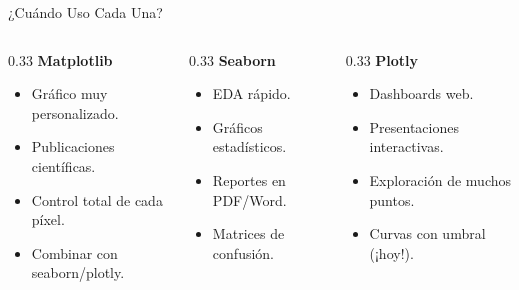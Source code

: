 \documentclass[aspectratio=169, 11pt]{beamer}
\begin{document}
\begin{frame}{¿Cuándo Uso Cada Una?}
  \vspace{-4pt}
  \begin{columns}[T]
    \begin{column}{0.33\textwidth}
      {\footnotesize\bfseries\color{codeBlue}\faCogs\hspace{4pt} Matplotlib}
      \vspace{4pt}

      {\scriptsize
      \begin{itemize}\setlength{\itemsep}{3pt}
        \item Gráfico muy personalizado.
        \item Publicaciones científicas.
        \item Control total de cada píxel.
        \item Combinar con seaborn/plotly.
      \end{itemize}
      }
    \end{column}

    \begin{column}{0.33\textwidth}
      {\footnotesize\bfseries\color{arcaRed}\faChartBar\hspace{4pt} Seaborn}
      \vspace{4pt}

      {\scriptsize
      \begin{itemize}\setlength{\itemsep}{3pt}
        \item EDA rápido.
        \item Gráficos estadísticos.
        \item Reportes en PDF/Word.
        \item Matrices de confusión.
      \end{itemize}
      }
    \end{column}

    \begin{column}{0.33\textwidth}
      {\footnotesize\bfseries\color{codePurple}\faMousePointer\hspace{4pt} Plotly}
      \vspace{4pt}

      {\scriptsize
      \begin{itemize}\setlength{\itemsep}{3pt}
        \item Dashboards web.
        \item Presentaciones interactivas.
        \item Exploración de muchos puntos.
        \item Curvas con umbral (¡hoy!).
      \end{itemize}
      }
    \end{column}
  \end{columns}


\end{frame}
\end{document}
